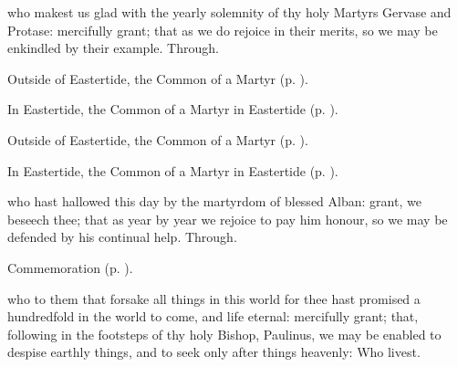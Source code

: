 
\memorialCollect
{} who makest us glad with the yearly solemnity of thy holy Martyrs Gervase and Protase: mercifully grant; that as we do rejoice in their merits, so we may be enkindled by their example. Through.



\begin{rubric}
	Outside of Eastertide, the Common of a Martyr (p. \pageref{CommonMartyrBishopCollect}).
\end{rubric}

\begin{rubric}
	In Eastertide, the Common of a Martyr in Eastertide (p. \pageref{CommonMartyrBishopEasterCollect}).
\end{rubric}


\clearpage
{}

\begin{rubric}
	Outside of Eastertide, the Common of a Martyr (p. \pageref{CommonMartyr}).
\end{rubric}

\begin{rubric}
	In Eastertide, the Common of a Martyr in Eastertide (p. \pageref{CommonMartyrEaster}).
\end{rubric}

{} who hast hallowed this day by the martyrdom of blessed Alban: grant, we beseech thee; that as year by year we rejoice to pay him honour, so we may be defended by his continual help. Through.

\begin{rubric}
	Commemoration  (p. \pageref{PaulinusCollect}).
\end{rubric}



\memorialCollect\label{PaulinusCollect}
 who to them that forsake all things in this world for thee hast promised a hundredfold in the world to come, and life eternal: mercifully grant; that, following in the footsteps of thy holy Bishop, Paulinus, we may be enabled to despise earthly things, and to seek only after things heavenly: Who livest.

